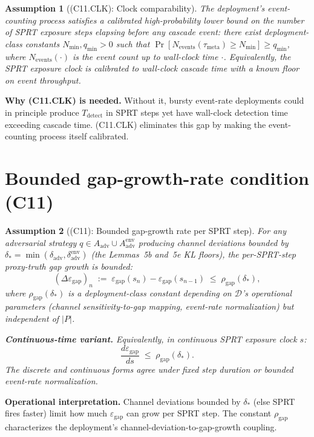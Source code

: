 \documentclass{article}
\newtheorem{assumption}{Assumption}
\newcommand{\Aadv}{A_{\mathrm{adv}}}
\newcommand{\deltaadv}{\delta_{\mathrm{adv}}}
\newcommand{\deltastar}{\delta_{*}}
\newcommand{\rhogap}{\rho_{\mathrm{gap}}}
\newcommand{\epsgap}{\varepsilon_{\mathrm{gap}}}
\begin{document}
\begin{assumption}[(C11.CLK): Clock comparability]
\label{ass:C11CLK}
The deployment's event-counting process satisfies a calibrated
high-probability lower bound on the number of SPRT exposure steps
elapsing before any cascade event: there exist deployment-class
constants $N_{\min}, q_{\min} > 0$ such that
$\Pr[N_{\mathrm{events}}(\tau_{\mathrm{meta}}) \geq N_{\min}] \geq
q_{\min}$, where $N_{\mathrm{events}}(\cdot)$ is the event count up
to wall-clock time $\cdot$.  Equivalently, the SPRT exposure clock
is calibrated to wall-clock cascade time with a known floor on
event throughput.
\end{assumption}

\textbf{Why (C11.CLK) is needed.}  Without it, bursty event-rate
deployments could in principle produce $T_{\mathrm{detect}}$ in
SPRT steps yet have wall-clock detection time exceeding cascade
time.  (C11.CLK) eliminates this gap by making the event-counting
process itself calibrated.

\section{Bounded gap-growth-rate condition (C11)}

\begin{assumption}[(C11): Bounded gap-growth rate per SPRT step]
\label{ass:C11}
For any adversarial strategy $q \in \Aadv \cup
\Aadv^{\mathrm{env}}$ producing channel deviations bounded by
$\deltastar = \min(\deltaadv, \delta_{\mathrm{adv}}^{\mathrm{env}})$
(the Lemmas~5b and~5e KL floors), the per-SPRT-step proxy-truth
gap growth is bounded:
\[
  (\Delta \epsgap)_n \;:=\; \epsgap(s_n) - \epsgap(s_{n-1}) \;\leq\;
  \rhogap(\deltastar),
\]
where $\rhogap(\deltastar)$ is a deployment-class constant
depending on $\mathcal{D}$'s operational parameters (channel
sensitivity-to-gap mapping, event-rate normalization) but
independent of $|P|$.

\textbf{Continuous-time variant.}  Equivalently, in continuous
SPRT exposure clock $s$:
\[
  \frac{d \epsgap}{ds} \;\leq\; \rhogap(\deltastar).
\]
The discrete and continuous forms agree under fixed step duration
or bounded event-rate normalization.
\end{assumption}

\textbf{Operational interpretation.}  Channel deviations bounded by
$\deltastar$ (else SPRT fires faster) limit how much $\epsgap$ can
grow per SPRT step.  The constant $\rhogap$ characterizes the
deployment's channel-deviation-to-gap-growth coupling.
\end{document}
